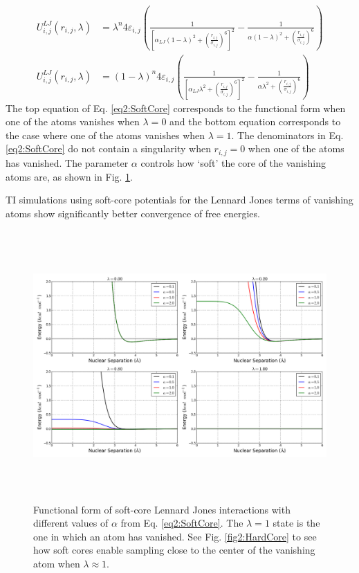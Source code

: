 \begin{align}
   U^{LJ}_{i,j}(r_{i,j}, \lambda) & = \lambda ^ n 4 \varepsilon_{i,j} \left(
      \frac 1 {\left[ \alpha_{LJ} (1-\lambda)^2 + \left( \frac {r_{i,j}}
      {\sigma_{i,j}} \right) ^ 6 \right] ^ 2} - \frac 1 {\alpha(1-\lambda)^2 +
      \left( \frac {r_{i,j}} {\sigma_{i,j}} \right) ^ 6} \right) \nonumber \\
   U^{LJ}_{i,j}(r_{i,j}, \lambda) & = (1-\lambda) ^ n 4 \varepsilon_{i,j} \left(
      \frac 1 {\left[ \alpha_{LJ} \lambda^2 + \left( \frac {r_{i,j}}
      {\sigma_{i,j}} \right) ^ 6 \right] ^ 2} - \frac 1 {\alpha \lambda^2 +
      \left( \frac {r_{i,j}} {\sigma_{i,j}} \right) ^ 6} \right)
   \label{eq2:SoftCore}
\end{align}
The top equation of Eq. \ref{eq2:SoftCore} corresponds to the functional form
when one of the atoms vanishes when $\lambda = 0$ and the bottom equation
corresponds to the case where one of the atoms vanishes when $\lambda = 1$. The
denominators in Eq.  \ref{eq2:SoftCore} do not contain a singularity when
$r_{i,j} = 0$ when one of the atoms has vanished. The parameter $\alpha$
controls how `soft' the core of the vanishing atoms are, as shown in Fig.
\ref{fig2:SoftCore}. \cite{Steinbrecher_JChemPhys_2007_v127_p214108}

TI simulations using soft-core potentials for the Lennard Jones terms of
vanishing atoms show significantly better convergence of free energies.
\cite{Steinbrecher_JChemPhys_2007_v127_p214108, Steinbrecher2011}

\begin{figure}
   \includegraphics[width=6.5in, height=4.06in]{SoftCore.png}
   \caption[Functional form of soft-core Lennard Jones interactions with
            different values of $\alpha$ from Eq. \ref{eq2:SoftCore}.]
           {Functional form of soft-core Lennard Jones interactions with
            different values of $\alpha$ from Eq. \ref{eq2:SoftCore}. The
            $\lambda = 1$ state is the one in which an atom has vanished. See
            Fig. \ref{fig2:HardCore} to see how soft cores enable sampling close
            to the center of the vanishing atom when $\lambda \approx 1$.}
   \label{fig2:SoftCore}
\end{figure}

